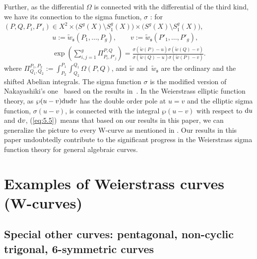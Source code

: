 \documentclass[pdftex]{sigma}
\def\fs{{\mathfrak s}}
\def\tw{{\widetilde w}}
\numberwithin{equation}{section}
\begin{document}
\begin{Remark}
Further, as the differential $\Omega$ is connected with the differential of the third kind, we have its connection to the sigma function, $\sigma$ \cite[Theorem~4]{KMP2022b}:
for $(P, Q, P_i, P'_i) \in X^2 \times \big(S^g(X)\setminus S^g_1(X)\big) \times
\big(S^g(X)\setminus S^g_1(X)\big)$,
\begin{gather}
	u := \tw_\fs(P_1, \dots, P_g), \qquad
	v := \tw_\fs(P'_1, \dots, P'_g),\nonumber\\
\exp\left(
\sum_{i, j = 1}^g
 \Pi_{P_i, P'_j}^{P, Q} \right)
=
\frac{\sigma(\tw(P) - u) \sigma(\tw(Q) - v)}
 {\sigma(\tw(Q) - u) \sigma(\tw(P) - v)}.
\label{eq:5.5}
\end{gather}
where $\Pi^{P_1, P_2}_{Q_1, Q_2} := \int^{P_1}_{P_2} \int^{Q_1}_{Q_2} \Omega(P, Q)$, and $\tw$ and~$\tw_\fs$ are the ordinary and the shifted Abelian integrals.
The sigma function $\sigma$ is the modified version of Nakayashiki's one~\cite{Nak16} based on the results in~\cite{KMP16}.
In the Weierstrass elliptic function theory, as $\wp(u-v){\rm d}u{\rm d}v$ has the double order pole at $u=v$ and the elliptic sigma function, $\sigma(u-v)$, is connected with the integral $\wp(u-v)$ with respect to ${\rm d}u$ and ${\rm d}v$,
(\ref{eq:5.5})~means that based on our results in this paper, we can generalize the picture to every W-curve as mentioned in \cite[Theorem~4]{KMP2022b}.
Our results in this paper undoubtedly contribute to the significant progress in the Weierstrass sigma function theory for general algebraic curves.
\end{Remark}

\section{Examples of Weierstrass curves (W-curves)}\label{sec:Exmples}

\subsection{Special other curves: pentagonal, non-cyclic trigonal, 6-symmetric curves}\label{2ssc:SpCurve}
\end{document}
